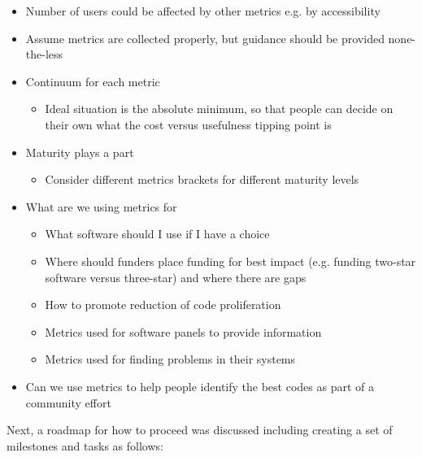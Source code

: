 \begin{itemize}
\item
Number of users could be affected by other metrics e.g. by accessibility

\item
Assume metrics are collected properly, but guidance should be provided none-the-less

\item
Continuum for each metric

\begin{itemize}
\item
        Ideal situation is the absolute minimum, so that people can decide on their own what the cost versus usefulness tipping point is
\end{itemize}

\item
Maturity plays a part

\begin{itemize}
\item
        Consider different metrics brackets for different maturity levels
\end{itemize}

\item
What are we using metrics for

\begin{itemize}
\item
        What software should I use if I have a choice

\item
        Where should funders place funding for best impact (e.g. funding two-star software versus three-star) and where there are gaps

\item
        How to promote reduction of code proliferation

\item
        Metrics used for software panels to provide information

\item
        Metrics used for finding problems in their systems

\end{itemize}

\item
Can we use metrics to help people identify the best codes as part of a community effort

\end{itemize}

\smallskip
\noindent
Next, a roadmap for how to proceed was discussed including creating a set of milestones and tasks as follows:

